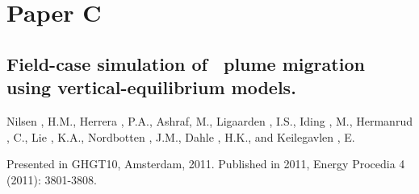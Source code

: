 \pagebreak

\chapter*{Paper C}
\label{paperC}

\section{Field-case simulation of \coo\ plume migration using vertical-equilibrium models.}

\noindent Nilsen , H.M., Herrera , P.A., Ashraf, M., Ligaarden , I.S., Iding , M., Hermanrud ,
C., Lie , K.A., Nordbotten , J.M., Dahle , H.K., and Keilegavlen , E.


\noindent Presented in GHGT10, Amsterdam, 2011. Published in 2011, Energy Procedia 4 (2011): 3801-3808.

\cleardoublepage


